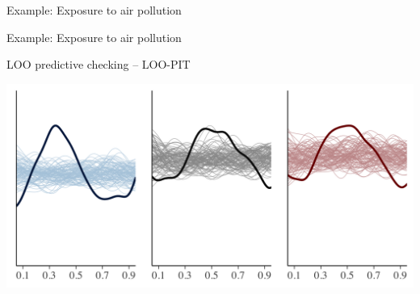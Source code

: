 \documentclass[t]{beamer}
\begin{document}
\begin{frame}{Example: Exposure to air pollution}
\begin{figure}
\end{figure}

\end{frame}

\begin{frame}{Example: Exposure to air pollution}


  LOO predictive checking -- LOO-PIT

\includegraphics[width=\textwidth]{ppc_loo_pit_corrected_pm25.png}



\end{frame}
\end{document}
